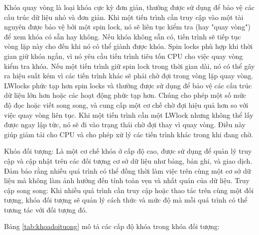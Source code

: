 \documentclass{article}[14pt]
\begin{document}
{{Khóa quay vòng là loại khóa cực kỳ đơn giản, thường được sử dụng để bảo
vệ các cấu trúc dữ liệu nhỏ và đơn giản. Khi một tiến trình cần truy cập vào một tài nguyên được bảo vệ bởi một spin lock, nó sẽ liên tục kiểm tra (hay "quay vòng") để xem khóa có sẵn hay không. Nếu khóa không sẵn có, tiến trình sẽ tiếp tục vòng lặp này cho đến khi nó có thể giành được khóa. Spin locks phù hợp khi thời gian giữ khóa ngắn, vì nó yêu cầu tiến trình tiêu tốn CPU cho việc quay vòng kiểm tra khóa. Nếu một tiến trình giữ spin lock trong thời gian dài, nó có thể gây ra hiệu suất kém vì các tiến trình khác sẽ phải chờ đợi trong vòng lặp quay vòng.
LWlocks phức tạp hơn spin locks và thường được sử dụng để bảo vệ các cấu
trúc dữ liệu lớn hơn hoặc các hoạt động phức tạp hơn. Chúng cho phép một
số mức độ đọc hoặc viết song song, và cung cấp một cơ chế chờ đợi hiệu quả
hơn so với việc quay vòng liên tục. Khi một tiến trình cần một LWlock nhưng không thể lấy được ngay lập tức, nó sẽ đi vào trạng thái chờ đợi thay vì quay vòng. Điều này giúp giảm tải cho CPU và cho phép xử lý các tiến trình khác trong khi đang chờ.

Khóa đối tượng: Là một cơ chế khóa ở cấp độ cao, được sử dụng để quản lý
truy cập và cập nhật trên các đối tượng cơ sở dữ liệu như bảng, bản ghi, và giao dịch. Đảm bảo rằng nhiều quá trình có thể đồng thời làm việc trên cùng một cơ sở dữ liệu mà không làm ảnh hưởng đến tính toàn vẹn và nhất quán của dữ liệu. Truy cập song song: Khi nhiều quá trình cần truy cập hoặc thao tác trên cùng một đối tượng, khóa đối tượng sẽ quản lý cách thức và mức độ mà mỗi quá trình có thể tương tác với đối tượng đó.

Bảng \ref{tab:khoadoituong} mô tả các cấp độ khóa trong khóa đối tượng: 

}}
\end{document}
